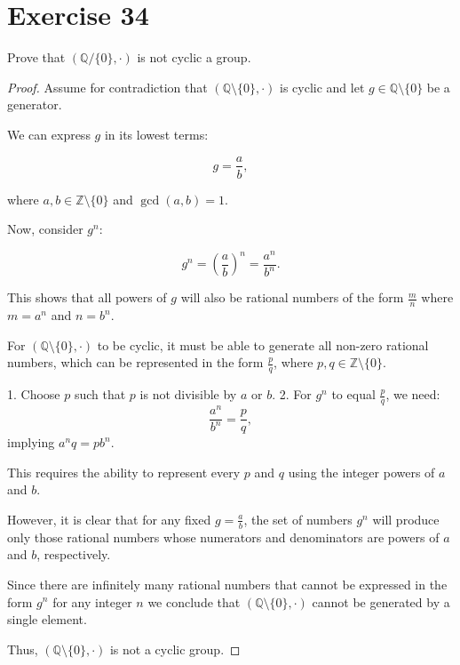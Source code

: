 \documentclass{article}
\begin{document}
\section*{Exercise 34}
Prove that $(\mathbb{Q} /\{0\}, \cdot)$ is not cyclic a group.
\begin{proof}
    Assume for contradiction that \((\mathbb{Q} \setminus \{0\}, \cdot)\) is cyclic and let \( g \in \mathbb{Q} \setminus \{0\} \) be a generator. 



We can express \( g \) in its lowest terms:

\[
g = \frac{a}{b},
\]

where \( a, b \in \mathbb{Z} \setminus \{0\} \) and \( \gcd(a, b) = 1 \).

Now, consider \( g^n \):

\[
g^n = \left(\frac{a}{b}\right)^n = \frac{a^n}{b^n}.
\]

This shows that all powers of \( g \) will also be rational numbers of the form \( \frac{m}{n} \) where \( m = a^n \) and \( n = b^n \).


For \((\mathbb{Q} \setminus \{0\}, \cdot)\) to be cyclic, it must be able to generate all non-zero rational numbers, which can be represented in the form \( \frac{p}{q} \), where \( p, q \in \mathbb{Z} \setminus \{0\} \). 

1. Choose \( p \) such that \( p \) is not divisible by \( a \) or \( b \).
2. For \( g^n \) to equal \( \frac{p}{q} \), we need:
   \[
   \frac{a^n}{b^n} = \frac{p}{q},
   \]
   implying \( a^n q = p b^n \).

This requires the ability to represent every \( p \) and \( q \) using the integer powers of \( a \) and \( b \).

However, it is clear that for any fixed \( g = \frac{a}{b} \), the set of numbers \( g^n \) will produce only those rational numbers whose numerators and denominators are powers of \( a \) and \( b \), respectively. 



Since there are infinitely many rational numbers that cannot be expressed in the form \( g^n \) for any integer \( n \)  we conclude that \((\mathbb{Q} \setminus \{0\}, \cdot)\) cannot be generated by a single element.

Thus, \((\mathbb{Q} \setminus \{0\}, \cdot)\) is not a cyclic group.

    \end{proof}
\end{document}
